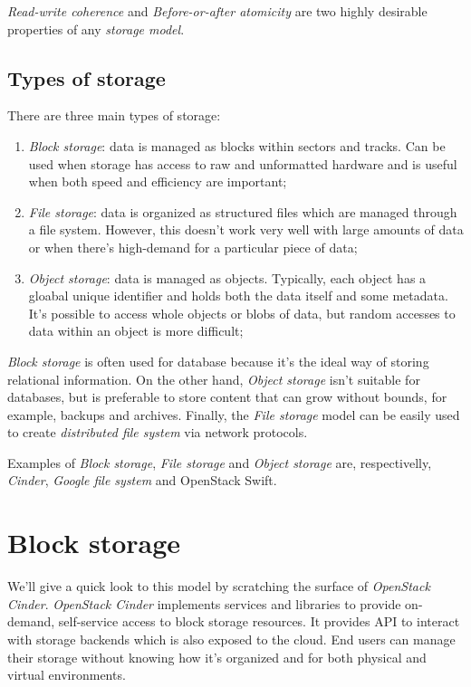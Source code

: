 \noindent
\emph{Read-write coherence} and \emph{Before-or-after atomicity} are two highly
desirable properties of any \emph{storage model}.

\subsection{Types of storage}
There are three main types of storage:
\begin{enumerate}
    \item \emph{Block storage}: data is managed as blocks within sectors and
    tracks. Can be used when storage has access to raw and unformatted hardware
    and is useful when both speed and efficiency are important;
    \item \emph{File storage}: data is organized as structured files which are
    managed through a file system. However, this doesn't work very well with
    large amounts of data or when there's high-demand for a particular piece
    of data;
    \item \emph{Object storage}: data is managed as objects. Typically, each
    object has a gloabal unique identifier and holds both the data itself and
    some metadata. It's possible to access whole objects or blobs of data, but
    random accesses to data within an object is more difficult;
\end{enumerate}

\noindent
\emph{Block storage} is often used for database because it's the ideal way of
storing relational information. On the other hand, \emph{Object storage} isn't
suitable for databases, but is preferable to store content that can grow without
bounds, for example, backups and archives. Finally, the \emph{File storage} model
can be easily used to create \emph{distributed file system} via network protocols.

Examples of \emph{Block storage}, \emph{File storage} and \emph{Object storage}
are, respectivelly, \emph{Cinder}, \emph{Google file system} and OpenStack Swift.

\section{Block storage}
We'll give a quick look to this model by scratching the surface of \emph{OpenStack
Cinder}. \emph{OpenStack Cinder} implements services and libraries to provide
on-demand, self-service access to block storage resources. It provides API to
interact with storage backends which is also exposed to the cloud. End users can
manage their storage without knowing how it's organized and for both physical and
virtual environments.

